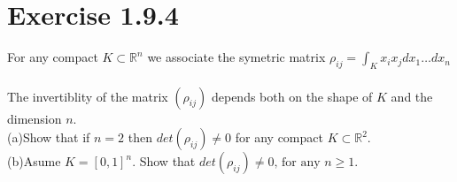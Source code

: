 \documentclass{article}
\begin{document}
\section*{Exercise 1.9.4}


For any compact $K \subset \mathbb{R}^n$ we associate the symetric matrix $\displaystyle \rho_{ij} = \int_{K} x_i x_j d x_1 \dots d x_n$ \\
\\
The invertiblity of the matrix $(\rho_{ij})$ depends both on the shape of $K$ and the dimension $n$. \\
(a)Show that if $n = 2$ then $det(\rho_{ij}) \neq 0$ for any compact $K \subset \mathbb{R}^2$.\\
(b)Asume $K = [0,1]^n$. Show that $det(\rho_{ij}) \neq 0 \text{, for any $n \geq 1$}$.
\end{document}
